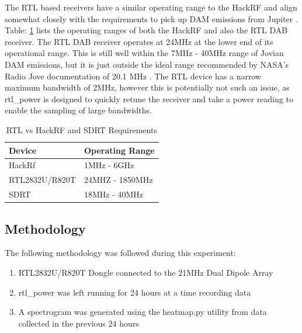 \documentclass[runningheads,a4paper]{llncs}
\begin{document}
The RTL based receivers have a similar operating range to the HackRF and align somewhat closely with the requirements to pick up \gls{DAM} emissions from Jupiter \citep{hamradioscience-12}. Table: \ref{tab:rtl_vs_hackrf} lists the operating ranges of both the HackRF and also the RTL DAB receiver. The RTL DAB receiver operates at 24MHz at the lower end of its operational range. This is still well within the 7MHz - 40MHz range of Jovian \gls{DAM} emissions, but it is just outside the ideal range recommended by NASA's Radio Jove documentation of 20.1 MHz \citep{nasa12}. The RTL device has a narrow maximum bandwidth of 2MHz, however this is potentially not such an issue, as rtl\_power is designed to quickly retune the receiver and take a power reading to enable the sampling of large bandwidths.

%
\begin{table}
	\centering
	\begin{tabular}{p{4cm} l}
		\toprule
		Device & Operating Range\\ \midrule
		HackRf & 1MHz - 6GHz \\
		RTL2832U/R820T & 24MHZ - 1850MHz \\
		SDRT & 18MHz - 40MHz \\
		\bottomrule
	\end{tabular}
	\caption{RTL vs HackRF and SDRT Requirements}
	\label{tab:rtl_vs_hackrf}
\end{table}
%

\subsection*{Methodology}
The following methodology was followed during this experiment:

\begin{enumerate}
	\item RTL2832U/R820T Dongle connected to the 21MHz Dual Dipole Array
	\item rtl\_power was left running for 24 hours at a time recording data
	\item A spectrogram was generated using the heatmap.py utility from data collected in the previous 24 hours
\end{enumerate}
\end{document}
